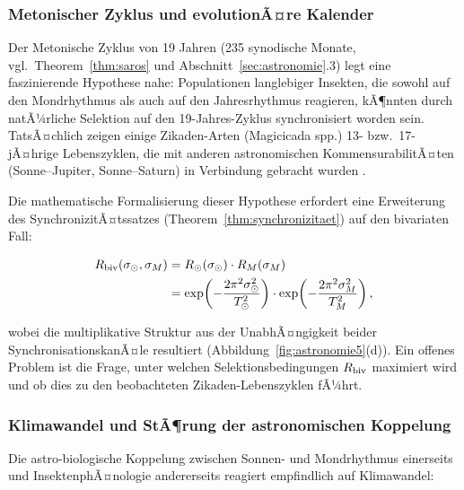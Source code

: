 ﻿\documentclass[12pt, a4paper]{article}
\theoremstyle{definition}
\begin{document}
\subsubsection{Metonischer Zyklus und evolutionÃ¤re Kalender}

Der Metonische Zyklus von 19 Jahren (235 synodische Monate, vgl.\
Theorem~\ref{thm:saros} und Abschnitt~\ref{sec:astronomie}.3) legt eine
faszinierende Hypothese nahe: Populationen langlebiger Insekten, die sowohl
auf den Mondrhythmus als auch auf den Jahresrhythmus reagieren, kÃ¶nnten durch
natÃ¼rliche Selektion auf den 19-Jahres-Zyklus synchronisiert worden sein.
TatsÃ¤chlich zeigen einige Zikaden-Arten (Magicicada spp.) 13- bzw.\ 17-jÃ¤hrige
Lebenszyklen, die mit anderen astronomischen Kommensurabi\-litÃ¤ten (Sonne--Jupiter,
Sonne--Saturn) in Verbindung gebracht wurden \cite{Yoshimura1997}.

Die mathematische Formalisierung dieser Hypothese erfordert eine Erweiterung des
SynchronizitÃ¤tssatzes (Theorem~\ref{thm:synchronizitaet}) auf den bivariaten Fall:

\begin{align*}
  R_{\rm biv}(\sigma_{\odot}, \sigma_M) &= R_{\odot}(\sigma_{\odot})\cdot R_M(\sigma_M) \\
  &= \exp\!\left(-\frac{2\pi^2\sigma_{\odot}^2}{T_{\odot}^2}\right)
    \cdot\exp\!\left(-\frac{2\pi^2\sigma_M^2}{T_M^2}\right),
\end{align*}

wobei die multiplikative Struktur aus der UnabhÃ¤ngigkeit beider
SynchronisationskanÃ¤le resultiert (Abbildung~\ref{fig:astronomie5}(d)). Ein
offenes Problem ist die Frage, unter welchen Selektionsbedingungen $R_{\rm biv}$
maximiert wird und ob dies zu den beobachteten Zikaden-Lebenszyklen fÃ¼hrt.

\subsubsection{Klimawandel und StÃ¶rung der astronomischen Koppelung}

Die astro-biologische Koppelung zwischen Sonnen- und Mondrhythmus einerseits und
InsektenphÃ¤nologie andererseits reagiert empfindlich auf Klimawandel:
\end{document}
